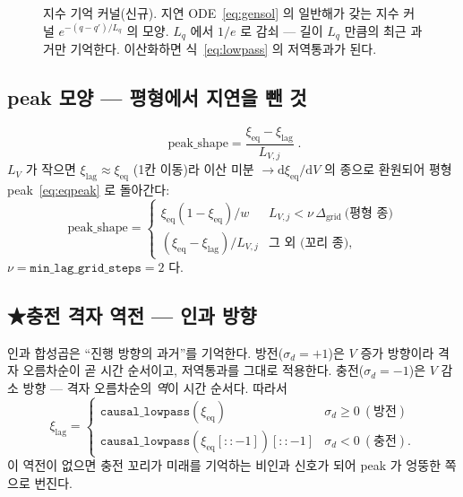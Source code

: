\documentclass[11pt,a4paper]{article}
\newcommand{\dd}{\mathrm{d}}
\newcommand{\eq}{\mathrm{eq}}
\newcommand{\code}[1]{\texttt{#1}}
\begin{document}
\begin{figure}[t]
\centering
{}
\caption{지수 기억 커널(신규). 지연 ODE~\eqref{eq:gensol} 의 일반해가 갖는 지수 커널
$e^{-(q-q')/L_q}$ 의 모양. $L_q$ 에서 $1/e$ 로 감쇠 — 길이 $L_q$ 만큼의 최근 과거만 기억한다.
이산화하면 식~\eqref{eq:lowpass} 의 저역통과가 된다.}
\label{fig:memorykernel}
\end{figure}

\subsection{peak 모양 — 평형에서 지연을 뺀 것}
\begin{equation}
\boxed{\;\text{peak\_shape}=\frac{\xi_{\eq}-\xi_{\mathrm{lag}}}{L_{V,j}}\;.}
\label{eq:peakshape}
\end{equation}
$L_V$ 가 작으면 $\xi_\mathrm{lag}\approx\xi_\eq$ (1칸 이동)라 이산 미분 $\to\dd\xi_\eq/\dd V$ 의
종으로 환원되어 평형 peak~\eqref{eq:eqpeak} 로 돌아간다:
\begin{equation}
\text{peak\_shape}=
\begin{cases}
\xi_\eq(1-\xi_\eq)/w & L_{V,j}<\nu\,\Delta_\mathrm{grid}\ \text{(평형 종)}\\[2pt]
(\xi_\eq-\xi_\mathrm{lag})/L_{V,j} & \text{그 외 (꼬리 종)},
\end{cases}
\label{eq:branch}
\end{equation}
$\nu=\code{min\_lag\_grid\_steps}=2$ 다.

\subsection{★충전 격자 역전 — 인과 방향}
인과 합성곱은 ``진행 방향의 과거''를 기억한다. 방전($\sigma_d=+1$)은 $V$ 증가 방향이라
격자 오름차순이 곧 시간 순서이고, 저역통과를 그대로 적용한다. 충전($\sigma_d=-1$)은 $V$ 감소 방향 —
격자 오름차순의 \emph{역}이 시간 순서다. 따라서
\begin{equation}
\xi_\mathrm{lag}=
\begin{cases}
\code{causal\_lowpass}(\xi_\eq) & \sigma_d\ge0\ (\text{방전})\\[2pt]
\code{causal\_lowpass}(\xi_\eq[::-1])[::-1] & \sigma_d<0\ (\text{충전}).
\end{cases}
\label{eq:reversal}
\end{equation}
이 역전이 없으면 충전 꼬리가 미래를 기억하는 비인과 신호가 되어 peak 가 엉뚱한 쪽으로 번진다.
\end{document}
